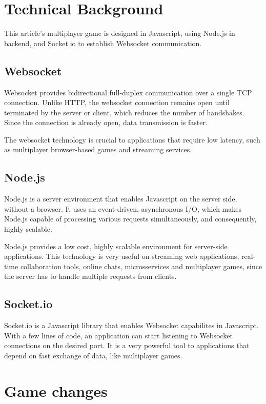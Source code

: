 \documentclass[english]{sbrt}
\begin{document}
\section{\textbf{Technical Background}}

This article's multiplayer game is designed in Javascript, using Node.js in backend, and Socket.io to establish Websocket communication.

\subsection{\textbf{Websocket}}
Websocket provides bidirectional full-duplex communication over a single TCP connection. Unlike HTTP, the websocket connection remains open until terminated by the server or client, which reduces the number of handshakes. Since the connection is already open, data transmission is faster.

The websocket technology is crucial to applications that require low latency, such as multiplayer browser-based games and streaming services.

\subsection{\textbf{Node.js}}
Node.js is a server environment that enables Javascript on the server side, without a browser. It uses an event-driven, asynchronous I/O, which makes Node.js capable of processing various requests simultaneously, and consequently, highly scalable.

Node.js provides a low cost, highly scalable environment for server-side applications. This technology is very useful on streaming web applications, real-time collaboration tools, online chats, microsservices and multiplayer games, since the server has to handle multiple requests from clients.

\subsection{\textbf{Socket.io}}
Socket.io is a Javascript library that enables Websocket capabilites in Javascript. With a few lines of code, an application can start listening to Websocket connections on the desired port. It is a very powerful tool to applications that depend on fast exchange of data, like multiplayer games.

\section{\textbf{Game changes}}
\end{document}
